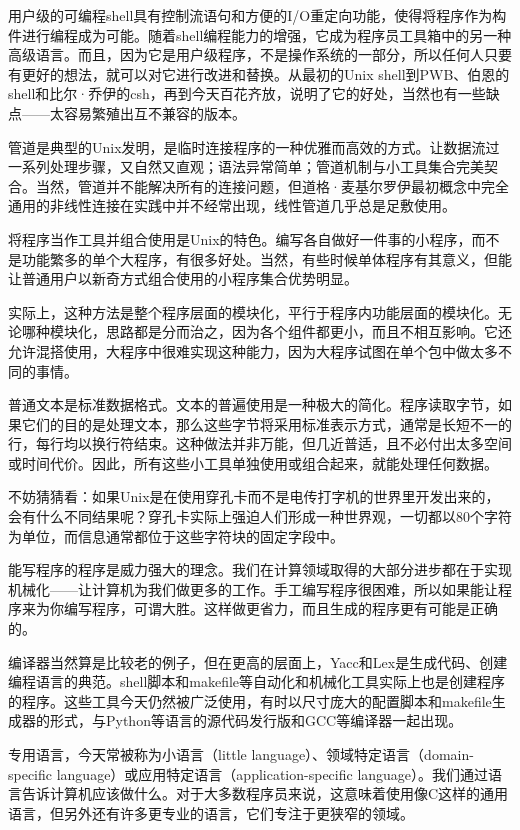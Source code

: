 \documentclass[a4paper,12pt,UTF8,twoside]{ctexbook}
\begin{document}
用户级的可编程shell具有控制流语句和方便的I/O重定向功能，使得将程序作为构件进行编程成为可能。随着shell编程能力的增强，它成为程序员工具箱中的另一种高级语言。而且，因为它是用户级程序，不是操作系统的一部分，所以任何人只要有更好的想法，就可以对它进行改进和替换。从最初的Unix shell到PWB、伯恩的shell和比尔·乔伊的csh，再到今天百花齐放，说明了它的好处，当然也有一些缺点——太容易繁殖出互不兼容的版本。

管道是典型的Unix发明，是临时连接程序的一种优雅而高效的方式。让数据流过一系列处理步骤，又自然又直观；语法异常简单；管道机制与小工具集合完美契合。当然，管道并不能解决所有的连接问题，但道格·麦基尔罗伊最初概念中完全通用的非线性连接在实践中并不经常出现，线性管道几乎总是足敷使用。

将程序当作工具并组合使用是Unix的特色。编写各自做好一件事的小程序，而不是功能繁多的单个大程序，有很多好处。当然，有些时候单体程序有其意义，但能让普通用户以新奇方式组合使用的小程序集合优势明显。

实际上，这种方法是整个程序层面的模块化，平行于程序内功能层面的模块化。无论哪种模块化，思路都是分而治之，因为各个组件都更小，而且不相互影响。它还允许混搭使用，大程序中很难实现这种能力，因为大程序试图在单个包中做太多不同的事情。

普通文本是标准数据格式。文本的普遍使用是一种极大的简化。程序读取字节，如果它们的目的是处理文本，那么这些字节将采用标准表示方式，通常是长短不一的行，每行均以换行符结束。这种做法并非万能，但几近普适，且不必付出太多空间或时间代价。因此，所有这些小工具单独使用或组合起来，就能处理任何数据。

不妨猜猜看：如果Unix是在使用穿孔卡而不是电传打字机的世界里开发出来的，会有什么不同结果呢？穿孔卡实际上强迫人们形成一种世界观，一切都以80个字符为单位，而信息通常都位于这些字符块的固定字段中。

能写程序的程序是威力强大的理念。我们在计算领域取得的大部分进步都在于实现机械化——让计算机为我们做更多的工作。手工编写程序很困难，所以如果能让程序来为你编写程序，可谓大胜。这样做更省力，而且生成的程序更有可能是正确的。

编译器当然算是比较老的例子，但在更高的层面上，Yacc和Lex是生成代码、创建编程语言的典范。shell脚本和makefile等自动化和机械化工具实际上也是创建程序的程序。这些工具今天仍然被广泛使用，有时以尺寸庞大的配置脚本和makefile生成器的形式，与Python等语言的源代码发行版和GCC等编译器一起出现。

专用语言，今天常被称为小语言（little language）、领域特定语言（domain-specific language）或应用特定语言（application-specific language）。我们通过语言告诉计算机应该做什么。对于大多数程序员来说，这意味着使用像C这样的通用语言，但另外还有许多更专业的语言，它们专注于更狭窄的领域。
\end{document}
